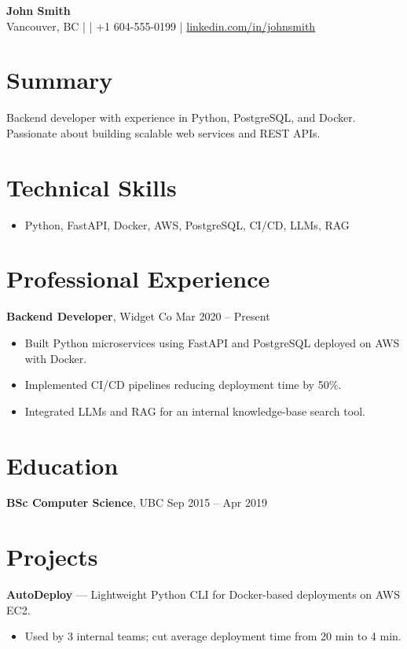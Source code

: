 \documentclass[10pt, letterpaper]{article}
\begin{document}
\begin{center}
    {\Large \textbf{John Smith}}\\[4pt]
    Vancouver, BC \quad|\quad
    \href{mailto:john@example.com}{} \quad|\quad
    +1 604-555-0199 \quad|\quad
    \href{https://linkedin.com/in/johnsmith}{linkedin.com/in/johnsmith}
\end{center}

\section*{Summary}
Backend developer with experience in Python, PostgreSQL, and Docker.
Passionate about building scalable web services and REST APIs.

\section*{Technical Skills}
\begin{itemize}[leftmargin=*]
    \item Python, FastAPI, Docker, AWS, PostgreSQL, CI/CD, LLMs, RAG
\end{itemize}

\section*{Professional Experience}
\textbf{Backend Developer}, Widget Co \hfill Mar 2020 -- Present
\begin{itemize}[leftmargin=*]
    \item Built Python microservices using FastAPI and PostgreSQL deployed on AWS with Docker.
    \item Implemented CI/CD pipelines reducing deployment time by 50\%.
    \item Integrated LLMs and RAG for an internal knowledge-base search tool.
\end{itemize}

\section*{Education}
\textbf{BSc Computer Science}, UBC \hfill Sep 2015 -- Apr 2019

\section*{Projects}
\textbf{AutoDeploy} — Lightweight Python CLI for Docker-based deployments on AWS EC2.
\begin{itemize}[leftmargin=*]
    \item Used by 3 internal teams; cut average deployment time from 20 min to 4 min.
\end{itemize}
\end{document}
